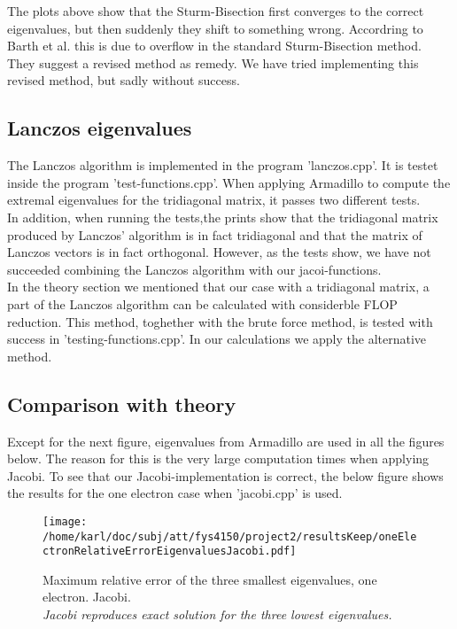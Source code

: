 \documentclass{article}
\begin{document}
The plots above show that the Sturm-Bisection first converges to the correct eigenvalues, but then suddenly they shift to something wrong. Accordring to Barth et al. \cite{barth} this is due to overflow in the standard Sturm-Bisection method. They suggest a revised method as remedy. We have tried implementing this revised method, but sadly without success.

\subsection{Lanczos eigenvalues}
The Lanczos algorithm is implemented in the program 'lanczos.cpp'. It is testet inside the program 'test-functions.cpp'. When applying Armadillo to compute the extremal eigenvalues for the tridiagonal matrix, it passes two different tests. \\

In addition, when running the tests,the prints show that the tridiagonal matrix produced by Lanczos' algorithm is in fact tridiagonal and that the matrix of Lanczos vectors is in fact orthogonal. However, as the tests show, we have not succeeded combining the Lanczos algorithm with our jacoi-functions.\\

In the theory section we mentioned that our case with a tridiagonal matrix, a part of the Lanczos algorithm can be calculated with considerble FLOP reduction. This method, toghether with the brute force method, is tested with success in 'testing-functions.cpp'. In our calculations we apply the alternative method. 


\subsection{Comparison with theory}
Except for the next figure, eigenvalues from Armadillo are used in all the figures below. The reason for this is the very large computation times when applying Jacobi. To see that our Jacobi-implementation is correct, the below figure shows the results for the one electron case when 'jacobi.cpp' is used.

\begin{figure}[H]
	\centering
	\texttt{[image: /home/karl/doc/subj/att/fys4150/project2/resultsKeep/oneElectronRelativeErrorEigenvaluesJacobi.pdf]}
	\caption{Maximum relative error of the three smallest eigenvalues, one electron. Jacobi.\\ \textit{Jacobi reproduces exact solution for the three lowest eigenvalues.}}
	\label{1}
\end{figure}
\end{document}
